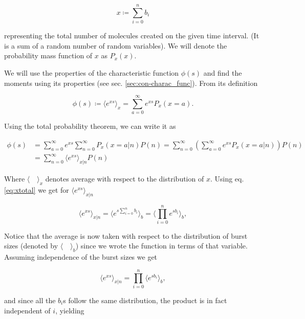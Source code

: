 \begin{equation}
  \label{eq:xtotal}
  x\coloneqq\sum_{i=0}^nb_i
\end{equation}

representing the total number of molecules created on the given time interval. (It is a sum of a random number of random variables). We will denote the probability mass function of $x$ as $P_x(x)$.

We will use the properties of the characteristic function $\phi(s)$ and find the moments using its properties (see sec. \ref{sec:con-charac_func}). From its definition

\begin{equation*}
  \phi(s) \coloneqq \langle e^{xs}\rangle_x = \sum_{a=0}^\infty e^{xs}P_x(x=a).
\end{equation*}

Using the total probability theorem, we can write it as

\begin{equation}
  \label{eq:charac1}
  \begin{split}
    \phi(s) &= \sum_{a=0}^\infty e^{xs}\sum_{n=0}^\infty P_x(x=a|n)P(n) = \sum_{n=0}^\infty\left(\sum_{a=0}^\infty e^{xs}P_x(x=a|n)\right)P(n)\\ 
&= \sum_{n=0}^\infty \langle e^{xs}\rangle_{x|n} P(n)
  \end{split}
\end{equation}

Where $\langle\quad\rangle_x$ denotes average with respect to the distribution of $x$. Using eq. \eqref{eq:xtotal} we get for $\langle e^{xs}\rangle_{x|n}$

\begin{equation*}
  \langle e^{xs}\rangle_{x|n} = \langle e^{s\sum_{i=0}^nb_i} \rangle_b = \langle \prod_{i=0}^ne^{sb_i}\rangle_b,
\end{equation*}

Notice that the average is now taken with respect to the distribution of burst sizes (denoted by $\langle\quad \rangle_b$) since we wrote the function in terms of that variable. Assuming independence of the burst sizes we get

\begin{equation*}
  \langle e^{xs}\rangle_{x|n} =  \prod_{i=0}^n\langle e^{sb_i}\rangle_b,
\end{equation*}

and since all the $b_i$s follow the same distribution, the product is in fact independent of $i$, yielding

